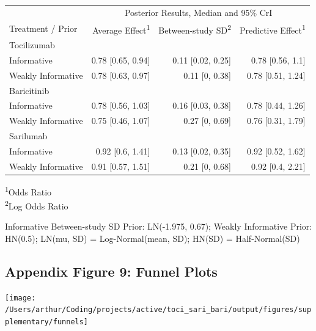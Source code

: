\documentclass[
  12pt,
]{article}
\begin{document}
\captionsetup[table]{labelformat=empty,skip=1pt}
\begin{longtable}{lrrr}
\toprule
 & \multicolumn{3}{c}{Posterior Results, Median and 95\% CrI} \\ 
 \cmidrule(lr){2-4}
Treatment / Prior & Average Effect\textsuperscript{1} & Between-study SD\textsuperscript{2} & Predictive Effect\textsuperscript{1} \\ 
\midrule
\multicolumn{1}{l}{Tocilizumab} \\ 
\midrule
Informative & 0.78 [0.65, 0.94] & 0.11 [0.02, 0.25] & 0.78 [0.56, 1.1] \\ 
Weakly Informative & 0.78 [0.63, 0.97] & 0.11 [0, 0.38] & 0.78 [0.51, 1.24] \\ 
\midrule
\multicolumn{1}{l}{Baricitinib} \\ 
\midrule
Informative & 0.78 [0.56, 1.03] & 0.16 [0.03, 0.38] & 0.78 [0.44, 1.26] \\ 
Weakly Informative & 0.75 [0.46, 1.07] & 0.27 [0, 0.69] & 0.76 [0.31, 1.79] \\ 
\midrule
\multicolumn{1}{l}{Sarilumab} \\ 
\midrule
Informative & 0.92 [0.6, 1.41] & 0.13 [0.02, 0.35] & 0.92 [0.52, 1.62] \\ 
Weakly Informative & 0.91 [0.57, 1.51] & 0.21 [0, 0.68] & 0.92 [0.4, 2.21] \\ 
 \bottomrule
\end{longtable}
\vspace{-5mm}
\begin{minipage}{\linewidth}
\textsuperscript{1}Odds Ratio \\ 
\textsuperscript{2}Log Odds Ratio \\ 
\end{minipage}
\begin{minipage}{\linewidth}
Informative Between-study SD Prior: LN(-1.975, 0.67); Weakly Informative Prior: HN(0.5); LN(mu, SD) = Log-Normal(mean, SD); HN(SD) = Half-Normal(SD)\\ 
\end{minipage}

\newpage

\hypertarget{appendix-figure-9-funnel-plots}{%
\subsection{Appendix Figure 9: Funnel
Plots}\label{appendix-figure-9-funnel-plots}}

\begin{center}\texttt{[image: /Users/arthur/Coding/projects/active/toci\_sari\_bari/output/figures/supplementary/funnels]} \end{center}
\end{document}
